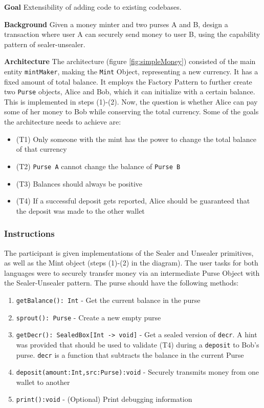 \noindent
\textbf{Goal} Extensibility of adding code to existing codebases.

\noindent
\textbf{Background} Given a money minter and two purses A and B, design a transaction where user A can securely send money to user B, using the capability pattern of sealer-unsealer. 

\noindent
\textbf{Architecture}
The architecture (figure \ref{fig:simpleMoney}) consisted of the main entity \texttt{mintMaker}, making the \texttt{Mint} Object, representing a new currency. It has a fixed amount of total balance. It employs the Factory Pattern to further create two \texttt{Purse} objects, Alice and Bob, which it can initialize with a certain balance. This is implemented in steps (1)-(2). Now, the question is whether Alice can pay some of her money to Bob while conserving the total currency. Some of the goals the architecture needs to achieve \cite{millerFinancial} are:
\begin{itemize}
    \item (T1) Only someone with the mint has the power to change the total balance of that currency
    \item (T2) \texttt{Purse A} cannot change the balance of \texttt{Purse B}
    \item (T3) Balances should always be positive
    \item (T4) If a successful deposit gets reported, Alice should be guaranteed that the deposit was made to the other wallet
\end{itemize}

\subsubsection{Instructions}
\noindent
The participant is given implementations of the Sealer and Unsealer primitives, as well as the Mint object (steps (1)-(2) in the diagram). The user tasks for both languages were to securely transfer money via an intermediate Purse Object with the Sealer-Unsealer pattern. The purse should have the following methods:
\begin{enumerate}
    \item \texttt{getBalance(): Int} - Get the current balance in the purse  
    \item \texttt{sprout(): Purse} - Create a new empty purse 
    \item \texttt{getDecr(): SealedBox[Int -> void]} - Get a sealed version of \texttt{decr}. A hint was provided that should be used to validate (T4) during a \texttt{deposit} to Bob's purse. \texttt{decr} is a function that subtracts the balance in the current Purse
    \item \texttt{deposit(amount:Int,src:Purse):void} - Securely transmits money from one wallet to another
    \item \texttt{print():void} - (Optional) Print debugging information
\end{enumerate}

